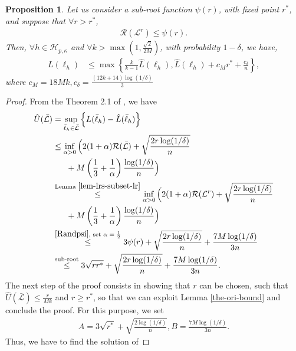 \documentclass{article}
\newtheorem{proposition}{Proposition}
\begin{document}
\begin{proposition}
\label{the-fixedpoint}
Let us consider a sub-root function $\psi(r)$, with fixed point $r^\ast$,
and suppose that $\forall r>r^\ast$,
  \begin{align}
  \label{Randpsi}
    \mathcal{R}(\mathcal{L}^r)\leq \psi(r).
  \end{align}
  Then, $\forall h\in\mathcal{H}_{p,\kappa}$ and $\forall k>\max(1,\frac{\sqrt{2}}{2M})$, with probability
  $1-\delta$, we have,
  \begin{align*}
   L(\ell_h)&\leq \max\left\{
        \frac{k}{k-1}\hat{L}(\ell_h),
       \hat{L}(\ell_h)+c_Mr^\ast+\frac{c_{\delta}}{n}
     \right\},
\end{align*}
where $c_M=18Mk, c_{\delta}=\frac{(12k+14)\log(1/\delta)}{3}$
\end{proposition}
\begin{proof}
  From the Theorem 2.1 of \cite{Bartlett2005lrc},
  we have
  \begin{align*}
    \hat{U}(\bar{\mathcal{L}})&=\sup_{\bar{\ell}_h\in\bar{\mathcal{L}}}\left\{L(\bar{\ell}_h)-\hat{L}(\bar{\ell}_h)\right\}\\
    &\leq \inf_{\alpha>0}\Big(2(1+\alpha)\mathcal{R}(\bar{\mathcal{L}})+
    \sqrt{\frac{2r\log(1/\delta)}{n}}\\&~~~~~+M\left(\frac{1}{3}+\frac{1}{\alpha}\right)\frac{\log(1/\delta)}{n}\Big)\\
    &\overset{\text{Lemma }\ref{lem-lrs-subset-lr}}{\leq}
    \inf_{\alpha>0}\Big(2(1+\alpha)\mathcal{R}(\mathcal{L}^r)+
    \sqrt{\frac{2r\log(1/\delta)}{n}}\\&~~~~~+M\left(\frac{1}{3}+\frac{1}{\alpha}\right)\frac{\log(1/\delta)}{n}\Big)\\
    &\overset{\eqref{Randpsi}, \text{ set $\alpha=\frac{1}{2}$}}{\leq} 3\psi(r)+\sqrt{\frac{2r\log(1/\delta)}{n}}+\frac{7M\log(1/\delta)}{3n}\\
    &\overset{\text{sub-root}}{\leq} 3\sqrt{rr^\ast}+\sqrt{\frac{2r\log(1/\delta)}{n}}+\frac{7M\log(1/\delta)}{3n}.
  \end{align*}
  The next step of the proof consists in showing that $r$ can be chosen,
  such that $\hat{U}(\bar{\mathcal{L}})\leq \frac{r}{Mk}$ and $r\geq r^\ast$,
  so that we can exploit Lemma \ref{the-ori-bound}
  and conclude the proof.
  For this purpose,
we set
\begin{align*}
  A=3\sqrt{r^\ast}+\sqrt{\frac{2\log(1/\delta)}{n}},
  B= \frac{7M\log(1/\delta)}{3n}.
\end{align*}
Thus, we have to find the solution of

\end{proof}
\end{document}

